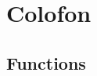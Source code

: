 \documentclass[11pt]{amsart}
\begin{document}



\newpage
\section{Colofon}


\listoftables

\newpage




\newpage
\begin{appendices}

\section{Functions}


\end{appendices}
\end{document}
